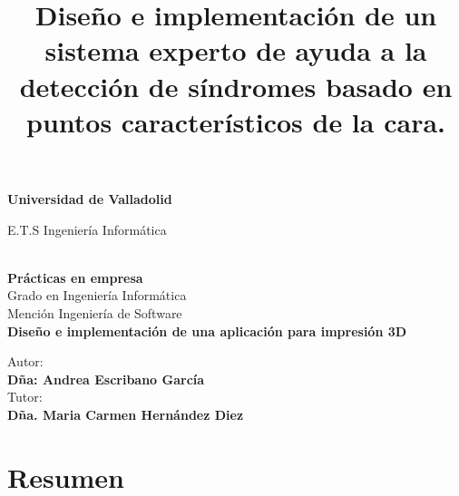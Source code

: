 \documentclass[a4paper,11pt, twoside]{article}
\title{Diseño e implementación de un sistema experto de ayuda a la detección de síndromes basado en puntos característicos de la cara.}
\newcommand\blankpage{\null\thispagestyle{empty}\addtocounter{page}{-1}\newpage}
\begin{document}
\renewcommand{\listtablename}{Índice de tablas}

\afterpage{\blankpage}    
\begin{titlepage}
        \begin{center}
            \vfill
            { \fontsize{18}{21.6}\selectfont \textbf{Universidad de Valladolid}}
            \\
            \vspace*{1in}
            \begin{large}
                {\fontsize{26}{31.2}\selectfont E.T.S Ingeniería Informática}
            \end{large}\\
            \vspace*{0.25in}
            { \fontsize{13}{15.6}\selectfont \textbf{Prácticas en empresa}}\\
            \vspace*{0.6in}
            {\fontsize{16}{19.2}\selectfont Grado en Ingeniería Informática\\
Mención Ingeniería de Software}\\
            \vspace*{0.8in}
            {\fontsize{28}{33.6}\selectfont \textbf{Diseño e implementación de una aplicación para impresión 3D}}\\
            \vspace*{1.1in}
            \begin{flushright}
                {\fontsize{17.28}{20.74}\selectfont Autor:\\
                \textbf{Dña: Andrea Escribano García} \\}
                \vspace*{0.1in}
                { \fontsize{17.28}{20.74}\selectfont
                Tutor:\\
                \textbf{Dña. Maria Carmen Hernández Diez }\\}
            \end{flushright}

        \end{center}
    \end{titlepage}
    
\setlength{\parindent}{0.5cm}
\setcounter{page}{1}
\section*{Resumen}
\end{document}
